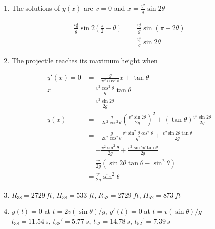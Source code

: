 \documentclass{article}
\begin{document}
\begin{enumerate}
  \item The solutions of $y(x)$ are $x = 0$ and $x = \frac{v^2}{g} \sin 2 \theta$

        \begin{align*}
          \frac{v_0^2}{g} \sin 2 \left( \frac{\pi}{2} - \theta \right) & = \frac{v_0^2}{g} \sin (\pi - 2 \theta) \\
                                                                       & = \frac{v_0^2}{g} \sin 2 \theta
        \end{align*}

  \item The projectile reaches its maximum height when

        \begin{align*}
          y'(x) = 0 & = -\frac{g}{v^2 \cos^2 \theta} x + \tan \theta                                                                                \\
          x         & = \frac{v^2 \cos^2 \theta}{g} \tan \theta                                                                                     \\
                    & = \frac{v^2 \sin 2 \theta}{2 g}                                                                                               \\
          y(x)      & = -\frac{g}{2 v^2 \cos^2 \theta} \left( \frac{v^2 \sin 2 \theta}{2 g} \right)^2 + (\tan \theta) \frac{v^2 \sin 2 \theta}{2 g} \\
                    & = -\frac{g}{2 v^2 \cos^2 \theta} \frac{v^4 \sin^2 \theta \cos^2 \theta}{g^2} + \frac{v^2 \sin 2 \theta \tan \theta}{2 g}      \\
                    & = -\frac{v^2 \sin^2 \theta}{2 g} + \frac{v^2 \sin 2 \theta \tan \theta}{2 g}                                                  \\
                    & = \frac{v^2}{2 g} (\sin 2 \theta \tan \theta - \sin^2 \theta)                                                                 \\
                    & = \frac{v^2}{2 g} \sin^2 \theta
        \end{align*}

  \item $R_{38} = \qty{2729}{ft}$, $H_{38} = \qty{533}{ft}$, $R_{52} = \qty{2729}{ft}$, $H_{52} = \qty{873}{ft}$

  \item $y(t) = 0$ at $t = 2 v (\sin \theta) / g$, $y'(t) = 0$ at $t = v (\sin \theta) / g$ \\ $t_{38} = \qty{11.54}{s}$, $t_{38}' = \qty{5.77}{s}$, $t_{52} = \qty{14.78}{s}$, $t_{52}' = \qty{7.39}{s}$
\end{enumerate}
\end{document}
